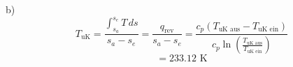 b)
\[
T_{\text{uK}} = \frac{\int_{s_a}^{s_e} T \, ds}{s_a - s_e} = \frac{q_{\text{rev}}}{s_a - s_e} = \frac{c_p (T_{\text{uK aus}} - T_{\text{uK ein}})}{c_p \ln \left( \frac{T_{\text{uK aus}}}{T_{\text{uK ein}}} \right)}
\]
\[
= 233.12 \text{ K}
\]